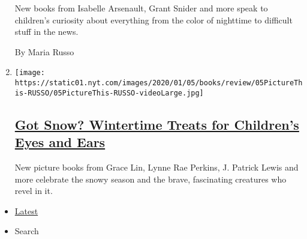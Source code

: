 \begin{enumerate}
  New books from Isabelle Arsenault, Grant Snider and more speak to
  children's curiosity about everything from the color of nighttime to
  difficult stuff in the news.

  By Maria Russo
\item
  \texttt{[image: https://static01.nyt.com/images/2020/01/05/books/review/05PictureThis-RUSSO/05PictureThis-RUSSO-videoLarge.jpg]}

  \hypertarget{got-snow-wintertime-treats-for-childrens-eyes-and-ears}{%
  \subsection{\texorpdfstring{\href{/2019/12/30/books/review/grace-lin-lynne-rae-perkins-j-patrick-lewis-snow-picture-books.html}{Got
  Snow? Wintertime Treats for Children's Eyes and
  Ears}}{Got Snow? Wintertime Treats for Children's Eyes and Ears}}\label{got-snow-wintertime-treats-for-childrens-eyes-and-ears}}

  New picture books from Grace Lin, Lynne Rae Perkins, J. Patrick Lewis
  and more celebrate the snowy season and the brave, fascinating
  creatures who revel in it.
\end{enumerate}

\begin{itemize}
\tightlist
\item
  \protect\hyperlink{stream-panel}{Latest}
\item
  Search
\end{itemize}

